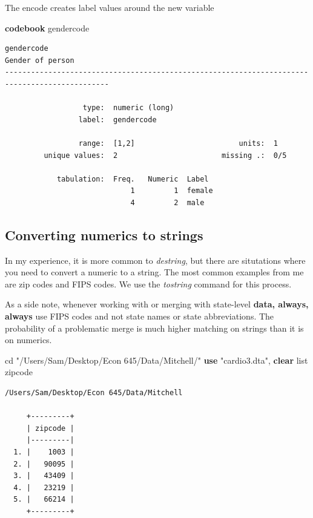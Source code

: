 \documentclass[
]{book}
\newenvironment{Shaded}{\begin{snugshade}}{\end{snugshade}}
\newcommand{\KeywordTok}[1]{\textcolor[rgb]{0.13,0.29,0.53}{\textbf{#1}}}
\newcommand{\NormalTok}[1]{#1}
\newcommand{\OtherTok}[1]{\textcolor[rgb]{0.56,0.35,0.01}{#1}}
\newcommand{\StringTok}[1]{\textcolor[rgb]{0.31,0.60,0.02}{#1}}
\begin{document}
The encode creates label values around the new variable

\begin{Shaded}
\begin{Highlighting}[]
\KeywordTok{codebook}\NormalTok{ gendercode}
\end{Highlighting}
\end{Shaded}

\begin{verbatim}
gendercode                                                                    Gender of person
----------------------------------------------------------------------------------------------

                  type:  numeric (long)
                 label:  gendercode

                 range:  [1,2]                        units:  1
         unique values:  2                        missing .:  0/5

            tabulation:  Freq.   Numeric  Label
                             1         1  female
                             4         2  male
\end{verbatim}

\subsection{Converting numerics to strings}\label{converting-numerics-to-strings}

In my experience, it is more common to \emph{destring}, but there are situtations where you need to convert a numeric to a string. The most common examples from me are zip codes and FIPS codes. We use the \emph{tostring} command for this process.

As a side note, whenever working with or merging with state-level \textbf{data, always, always} use FIPS codes and not state names or state abbreviations. The probability of a problematic merge is much higher matching on strings than it is on numerics.

\begin{Shaded}
\begin{Highlighting}[]
\NormalTok{cd }\StringTok{"/Users/Sam/Desktop/Econ 645/Data/Mitchell/"}
\KeywordTok{use} \StringTok{"cardio3.dta"}\NormalTok{, }\KeywordTok{clear}
\OtherTok{list}\NormalTok{ zipcode}
\end{Highlighting}
\end{Shaded}

\begin{verbatim}
/Users/Sam/Desktop/Econ 645/Data/Mitchell

     +---------+
     | zipcode |
     |---------|
  1. |    1003 |
  2. |   90095 |
  3. |   43409 |
  4. |   23219 |
  5. |   66214 |
     +---------+
\end{verbatim}
\end{document}
